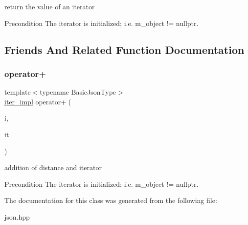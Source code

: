 return the value of an iterator 

\begin{DoxyPrecond}{Precondition}
The iterator is initialized; i.\+e. {\ttfamily m\+\_\+object != nullptr}. 
\end{DoxyPrecond}


\subsection{Friends And Related Function Documentation}
\mbox{\label{classnlohmann_1_1detail_1_1iter__impl_a94108d1a7563e103534f23eb5c1ee175}} 
\subsubsection{\texorpdfstring{operator+}{operator+}}
{\footnotesize\ttfamily template$<$typename Basic\+Json\+Type$>$ \\
\mbox{\hyperlink{classnlohmann_1_1detail_1_1iter__impl}{iter\+\_\+impl}} operator+ (\begin{DoxyParamCaption}\item[{\mbox{\hyperlink{classnlohmann_1_1detail_1_1iter__impl_a2f7ea9f7022850809c60fc3263775840}{difference\+\_\+type}}}]{i,  }\item[{const \mbox{\hyperlink{classnlohmann_1_1detail_1_1iter__impl}{iter\+\_\+impl}}$<$ Basic\+Json\+Type $>$ \&}]{it }\end{DoxyParamCaption})\hspace{0.3cm}{\ttfamily [friend]}}



addition of distance and iterator 

\begin{DoxyPrecond}{Precondition}
The iterator is initialized; i.\+e. {\ttfamily m\+\_\+object != nullptr}. 
\end{DoxyPrecond}


The documentation for this class was generated from the following file\+:\begin{DoxyCompactItemize}
\item 
json.\+hpp\end{DoxyCompactItemize}
